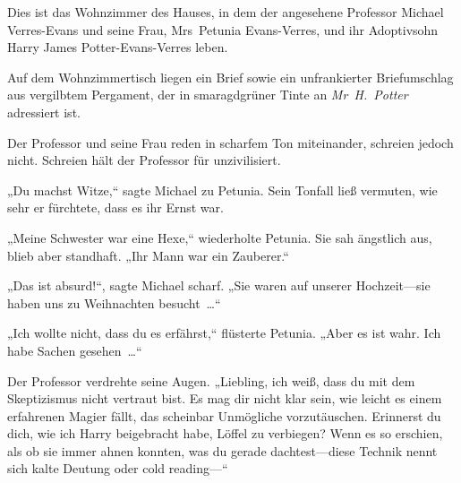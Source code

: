Dies ist das Wohnzimmer des Hauses, in dem der angesehene Professor Michael Verres-Evans und seine Frau, Mrs~Petunia Evans-Verres, und ihr Adoptivsohn Harry James Potter-Evans-Verres leben.

Auf dem Wohnzimmertisch liegen ein Brief sowie ein unfrankierter Briefumschlag aus vergilbtem Pergament, der in smaragdgrüner Tinte an \emph{Mr~H.~Potter} adressiert ist.

Der Professor und seine Frau reden in scharfem Ton miteinander, schreien jedoch nicht. Schreien hält der Professor für unzivilisiert.

„Du machst Witze,“ sagte Michael zu Petunia. Sein Tonfall ließ vermuten, wie sehr er fürchtete, dass es ihr Ernst war.

„Meine Schwester war eine Hexe,“ wiederholte Petunia. Sie sah ängstlich aus, blieb aber standhaft. „Ihr Mann war ein Zauberer.“

„Das ist absurd!“, sagte Michael scharf. „Sie waren auf unserer Hochzeit—sie haben uns zu Weihnachten besucht …“

„Ich wollte nicht, dass du es erfährst,“ flüsterte Petunia. „Aber es ist wahr. Ich habe Sachen gesehen …“

Der Professor verdrehte seine Augen. „Liebling, ich weiß, dass du mit dem Skeptizismus nicht vertraut bist. Es mag dir nicht klar sein, wie leicht es einem erfahrenen Magier fällt, das scheinbar Unmögliche vorzutäuschen. Erinnerst du dich, wie ich Harry beigebracht habe, Löffel zu verbiegen? Wenn es so erschien, als ob sie immer ahnen konnten, was du gerade dachtest—diese Technik nennt sich kalte Deutung oder cold reading—“

